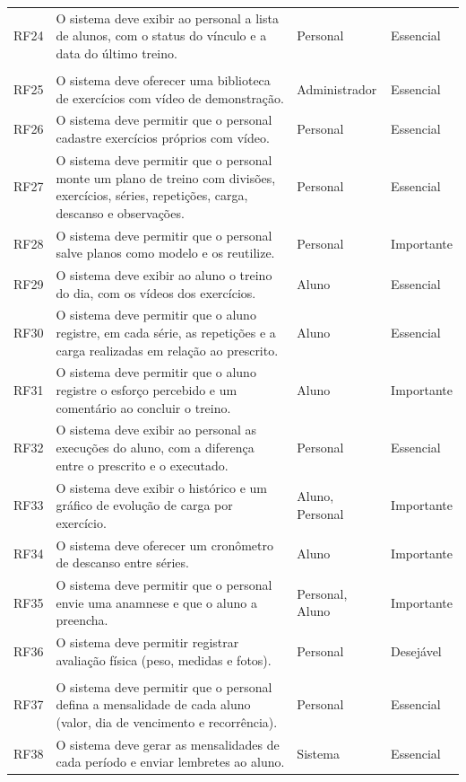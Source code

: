 \begin{longtable}{@{}>{\raggedright\arraybackslash}p{1.2cm} >{\raggedright\arraybackslash}p{7.6cm} >{\raggedright\arraybackslash}p{2.7cm} >{\raggedright\arraybackslash}p{2.4cm}@{}}
  RF24 & O sistema deve exibir ao personal a lista de alunos, com o status do vínculo e a data do último treino. & Personal & Essencial \\
  \addlinespace
  \multicolumn{4}{@{}l}{\textbf{Treino}} \\
  RF25 & O sistema deve oferecer uma biblioteca de exercícios com vídeo de demonstração. & Administrador & Essencial \\
  RF26 & O sistema deve permitir que o personal cadastre exercícios próprios com vídeo. & Personal & Essencial \\
  RF27 & O sistema deve permitir que o personal monte um plano de treino com divisões, exercícios, séries, repetições, carga, descanso e observações. & Personal & Essencial \\
  RF28 & O sistema deve permitir que o personal salve planos como modelo e os reutilize. & Personal & Importante \\
  RF29 & O sistema deve exibir ao aluno o treino do dia, com os vídeos dos exercícios. & Aluno & Essencial \\
  RF30 & O sistema deve permitir que o aluno registre, em cada série, as repetições e a carga realizadas em relação ao prescrito. & Aluno & Essencial \\
  RF31 & O sistema deve permitir que o aluno registre o esforço percebido e um comentário ao concluir o treino. & Aluno & Importante \\
  RF32 & O sistema deve exibir ao personal as execuções do aluno, com a diferença entre o prescrito e o executado. & Personal & Essencial \\
  RF33 & O sistema deve exibir o histórico e um gráfico de evolução de carga por exercício. & Aluno, Personal & Importante \\
  RF34 & O sistema deve oferecer um cronômetro de descanso entre séries. & Aluno & Importante \\
  RF35 & O sistema deve permitir que o personal envie uma anamnese e que o aluno a preencha. & Personal, Aluno & Importante \\
  RF36 & O sistema deve permitir registrar avaliação física (peso, medidas e fotos). & Personal & Desejável \\
  \addlinespace
  \multicolumn{4}{@{}l}{\textbf{Mensalidades}} \\
  RF37 & O sistema deve permitir que o personal defina a mensalidade de cada aluno (valor, dia de vencimento e recorrência). & Personal & Essencial \\
  RF38 & O sistema deve gerar as mensalidades de cada período e enviar lembretes ao aluno. & Sistema & Essencial \\

\end{longtable}

